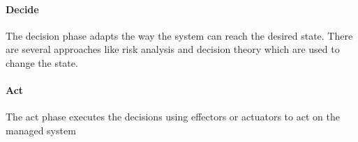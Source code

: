 \paragraph*{Decide}

The decision phase adapts the way the system can reach the desired state. There are several approaches like risk analysis and decision theory which are used to change the state. 

\paragraph*{Act}

The act phase executes the  decisions using effectors or actuators to act on the managed system 